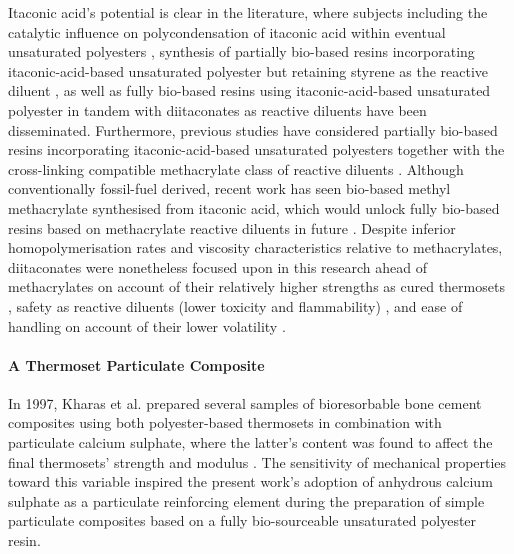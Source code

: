 Itaconic acid's potential is clear in the literature, where
 subjects including the catalytic influence on polycondensation
 of itaconic acid within eventual unsaturated polyesters 
 \autocite{Schoon2017}, synthesis of partially bio-based resins
 incorporating itaconic-acid-based unsaturated polyester but
 retaining styrene as the reactive diluent \autocite{Costa2017},
 as well as fully bio-based resins using itaconic-acid-based
 unsaturated polyester in tandem with diitaconates as
 reactive diluents \autocite{Pantic2022,Panic2017} have been
 disseminated.
Furthermore, previous studies have considered partially bio-based
 resins incorporating itaconic-acid-based unsaturated polyesters
 together with the cross-linking compatible methacrylate class
 of reactive diluents \autocite{Spasojevic2021,Dai2017}.
Although conventionally fossil-fuel derived, recent work has seen
 bio-based methyl methacrylate synthesised from
 itaconic acid, which would unlock fully bio-based resins based
 on methacrylate reactive diluents in future \autocite{Nagai2001,Bohre2021}.
Despite inferior homopolymerisation rates \autocite{Sollka2020} and viscosity
 characteristics \autocite{Spasojevic2021} relative to methacrylates, 
 diitaconates were nonetheless focused upon in this research ahead of 
 methacrylates on account of their relatively higher strengths as cured 
 thermosets \autocite{Spasojevic2021}, safety as reactive diluents 
 (lower toxicity and flammability) \autocite{Leonard1970}, and
 ease of handling on account of their lower volatility
 \autocite{Spasojevic2021,Trejbal2022}.

\paragraph{A Thermoset Particulate Composite}
In 1997, Kharas et al. prepared several samples of bioresorbable bone
 cement composites using both polyester-based thermosets in combination
 with particulate calcium sulphate, where the latter's content was
 found to affect the final thermosets' strength and modulus
 \autocite{Kharas1997}.
The sensitivity of mechanical properties toward this variable inspired
 the present work's adoption of anhydrous calcium sulphate as a
 particulate reinforcing element during the preparation of 
 simple particulate composites based on a fully bio-sourceable
 unsaturated polyester resin.

